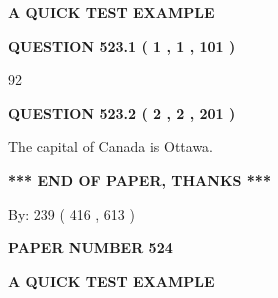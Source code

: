 \documentclass[12pt]{article}
\begin{document}
   
 \vspace{0.2in}
{\LARGE {\textbf{ A QUICK TEST EXAMPLE}}}
   
   
  
\vspace{0.2in}
  
{\textbf{\Large{QUESTION
523.1 
 ( 1 , 1 , 101 )
}}}
  
  
 
 
\noindent{}

92
 
 
  
\vspace{0.2in}
  
{\textbf{\Large{QUESTION
523.2 
 ( 2 , 2 , 201 )
}}}
  
  
 
 
\noindent{}
 
 
The capital of Canada is Ottawa.
 
 
 
 
   
   
 \vspace{0.2in}
 
   
   
   
   
\vspace{1.0in} 
{\textbf{\large{ *** END OF PAPER, THANKS *** }}} 
   
   
\hspace{1.0in} By: 
 239 ( 416 ,  613 )
   
   
   
   
\newpage 
\setcounter{page}{ 
   524001 } 
   
   
   
   
 {\textbf{ \Large{ PAPER NUMBER  524  }}}
   
   
\vspace{0.2in}
   
   
   
   
   
   
 \vspace{0.2in}
{\LARGE {\textbf{ A QUICK TEST EXAMPLE}}}
   
   
  
\vspace{0.2in}
  
\end{document}
